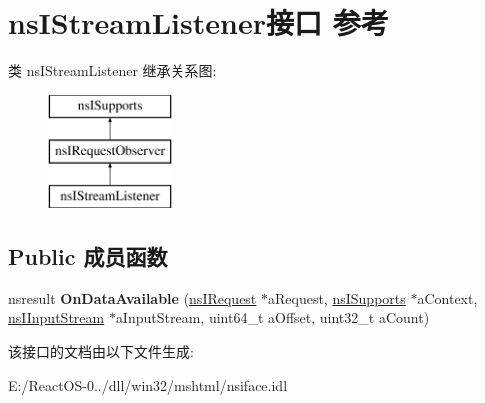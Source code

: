 \hypertarget{interfacens_i_stream_listener}{}\section{ns\+I\+Stream\+Listener接口 参考}
\label{interfacens_i_stream_listener}
类 ns\+I\+Stream\+Listener 继承关系图\+:\begin{figure}[H]
\begin{center}
\leavevmode
\includegraphics[height=3.000000cm]{interfacens_i_stream_listener}
\end{center}
\end{figure}
\subsection*{Public 成员函数}
\begin{DoxyCompactItemize}
\item 
\mbox{\label{interfacens_i_stream_listener_a459bbae274ff4932a55c6e977e7a69eb}} 
nsresult {\bfseries On\+Data\+Available} (\hyperlink{interfacens_i_request}{ns\+I\+Request} $\ast$a\+Request, \hyperlink{interfacens_i_supports}{ns\+I\+Supports} $\ast$a\+Context, \hyperlink{interfacens_i_input_stream}{ns\+I\+Input\+Stream} $\ast$a\+Input\+Stream, uint64\+\_\+t a\+Offset, uint32\+\_\+t a\+Count)
\end{DoxyCompactItemize}


该接口的文档由以下文件生成\+:\begin{DoxyCompactItemize}
\item 
E\+:/\+React\+O\+S-\/0../dll/win32/mshtml/nsiface.\+idl\end{DoxyCompactItemize}
